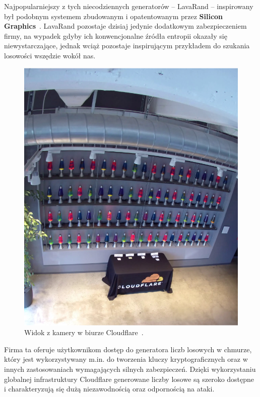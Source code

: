 Najpopularniejszy z tych niecodziennych generatorów -- LavaRand -- inspirowany był podobnym systemem zbudowanym i
opatentowanym przez \textbf{Silicon Graphics}~\cite{SiliconGraphics}.
LavaRand pozostaje dzisiaj jedynie dodatkowym zabezpieczeniem firmy,
na wypadek gdyby ich konwencjonalne źródła entropii okazały się niewystarczające,
jednak wciąż pozostaje inspirującym przykładem do szukania losowości wszędzie wokół nas.

\begin{figure}[H]
    \centering
    \includegraphics[width=0.4\linewidth]{chapters/02-teoria/figures/lavarandCamera}
    \caption{Widok z kamery w biurze Cloudflare~\cite{cloudflare_lavarand}.}
    \label{fig:lavarand}
\end{figure}


Firma ta oferuje użytkownikom dostęp do generatora liczb losowych w chmurze, który jest wykorzystywany
m.in. do tworzenia kluczy kryptograficznych oraz w innych zastosowaniach wymagających silnych zabezpieczeń.
Dzięki wykorzystaniu globalnej infrastruktury Cloudflare generowane liczby losowe są
szeroko dostępne i charakteryzują się dużą niezawodnością oraz odpornością na ataki.

